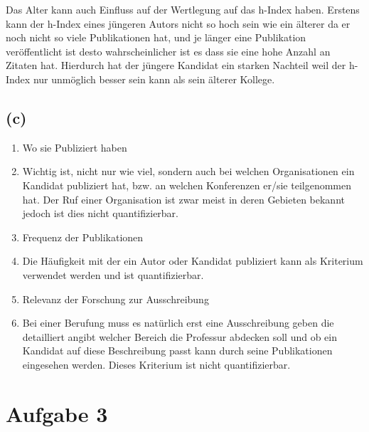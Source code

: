 \documentclass[11pt,a4paper,parskip=half ]{scrartcl}
\begin{document}
		Das Alter kann auch Einfluss auf der Wertlegung auf das h-Index haben. Erstens kann der h-Index eines jüngeren Autors nicht so hoch sein wie ein älterer da er noch nicht so viele Publikationen hat, und je länger eine Publikation veröffentlicht ist desto wahrscheinlicher ist es dass sie eine hohe Anzahl an Zitaten hat. Hierdurch hat der jüngere Kandidat ein starken Nachteil weil der h-Index nur unmöglich \glqq{} besser\grqq{} sein kann als sein älterer Kollege.
	
		\subsection*{(c)}
		\begin{enumerate}
			\item Wo sie Publiziert haben
			\item[] Wichtig ist, nicht nur wie viel, sondern auch bei welchen Organisationen ein Kandidat publiziert hat, bzw. an welchen Konferenzen er/sie teilgenommen hat. Der Ruf einer Organisation ist zwar meist in deren Gebieten bekannt jedoch ist dies nicht quantifizierbar.
			\item Frequenz der Publikationen
			\item[] Die Häufigkeit mit der ein Autor oder Kandidat publiziert kann als Kriterium verwendet werden und ist quantifizierbar.
			\item Relevanz der Forschung zur Ausschreibung
			\item[] Bei einer Berufung muss es natürlich erst eine Ausschreibung geben die detailliert angibt welcher Bereich die Professur abdecken soll und ob ein Kandidat auf diese Beschreibung passt kann durch seine Publikationen eingesehen werden. Dieses Kriterium ist nicht quantifizierbar.
		\end{enumerate}
	
	\section*{Aufgabe 3}
\end{document}
